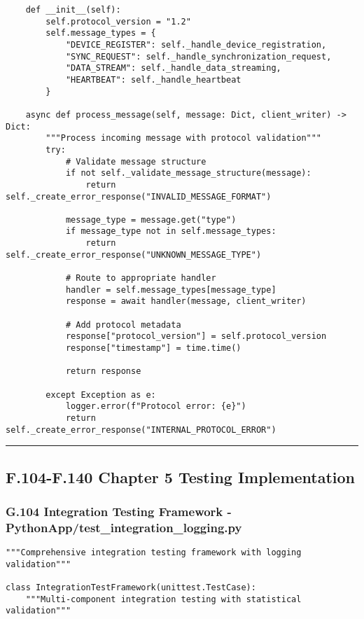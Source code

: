\documentclass[12pt,a4paper]{article}
\begin{document}
{{\begin{verbatim}
    def __init__(self):
        self.protocol_version = "1.2"
        self.message_types = {
            "DEVICE_REGISTER": self._handle_device_registration,
            "SYNC_REQUEST": self._handle_synchronization_request,
            "DATA_STREAM": self._handle_data_streaming,
            "HEARTBEAT": self._handle_heartbeat
        }
        
    async def process_message(self, message: Dict, client_writer) -> Dict:
        """Process incoming message with protocol validation"""
        try:
            # Validate message structure
            if not self._validate_message_structure(message):
                return self._create_error_response("INVALID_MESSAGE_FORMAT")
            
            message_type = message.get("type")
            if message_type not in self.message_types:
                return self._create_error_response("UNKNOWN_MESSAGE_TYPE")
            
            # Route to appropriate handler
            handler = self.message_types[message_type]
            response = await handler(message, client_writer)
            
            # Add protocol metadata
            response["protocol_version"] = self.protocol_version
            response["timestamp"] = time.time()
            
            return response
            
        except Exception as e:
            logger.error(f"Protocol error: {e}")
            return self._create_error_response("INTERNAL_PROTOCOL_ERROR")
\end{verbatim}

\hrule

\subsection{F.104-F.140 Chapter 5 Testing Implementation}

\subsubsection{G.104 Integration Testing Framework - PythonApp/test_integration_logging.py}

\begin{verbatim}
"""Comprehensive integration testing framework with logging validation"""

class IntegrationTestFramework(unittest.TestCase):
    """Multi-component integration testing with statistical validation"""
    

\end{verbatim}}}
\end{document}
